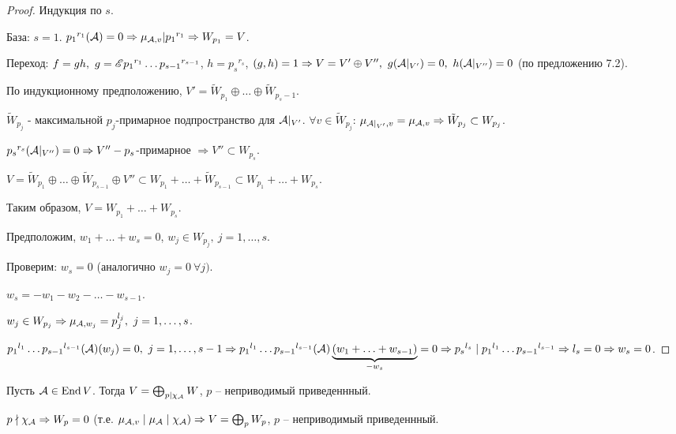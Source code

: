 \documentclass[main]{subfiles}
\begin{document}
\begin{proof}
    Индукция по $s$.

    База: $s = 1$. ${p_1}^{r_1}(\mathcal{A}) = 0 \Rightarrow \mu_{\mathcal{A}, v} | {p_1}^{r_1} \Rightarrow W_{p_1} = V$.

    Переход: $f = gh, \ g = \mathscr{E} {p_1}^{r_1} \ldots {p_{s-1}}^{r_{s-1}}$, $h = {p_s}^{r_s}$, $(g, h) = 1 \Rightarrow
        V = V' \oplus V'', \ g(\mathcal{A} |_{V'}) = 0, \ h(\mathcal{A} |_{V''}) = 0$ (по предложению 7.2).

    По индукционному предположению, $V' =  \tilde{W}_{p_1} \oplus \ldots \oplus \tilde{W}_{p_s-1}$.

    $\tilde{W}_{p_j}$ - максимальной $p_j$-примарное подпространство для $\mathcal{A} |_{V'}$.
    $\forall v \in \tilde{W}_{p_j}$: $\mu_{\mathcal{A} |_{V'}, v} = \mu_{\mathcal{A}, v} \Rightarrow \tilde{W}_{p_j} \subset W_{p_j}$.

    ${p_s}^{r_s}(\mathcal{A} |_{V''}) = 0 \Rightarrow V'' - p_s$-примарное $ \Rightarrow
        V'' \subset W_{p_s}$.

    $V = \tilde{W}_{p_1} \oplus \ldots \oplus \tilde{W}_{p_{s-1}} \oplus V'' \subset W_{p_1} + \ldots + \tilde{W}_{p_{s-1}} \subset W_{p_1} + \ldots + W_{p_s}$.

    Таким образом, $V = W_{p_1} + \ldots + W_{p_s}$.

    Предположим, $w_1 + \ldots + w_s = 0$, $w_j \in W_{p_j}, \ j = 1, \ldots, s$.

    Проверим: $w_s = 0$ (аналогично $w_j = 0 \ \forall j)$.

    $w_s = - w_1 - w_2 - \ldots - w_{s-1}$.

    $w_j \in W_{p_j} \Rightarrow \mu_{\mathcal{A}, w_j} = p_j^{l_j}, \ j = 1, \ldots, s$.

    ${p_1}^{l_1} \ldots {p_{s-1}}^{l_{s-1}} (\mathcal{A}) (w_j) = 0, \ j = 1, \ldots, s-1 \Rightarrow
        {p_1}^{l_1} \ldots {p_{s-1}}^{l_{s-1}} (\mathcal{A}) \underbrace{(w_1 + \ldots + w_{s-1})}_{-w_s} = 0  \Rightarrow
        {p_s}^{l_s} \mid {p_1}^{l_1} \ldots {p_{s-1}}^{l_{s-1}} \Rightarrow l_s = 0 \Rightarrow w_s = 0$.
\end{proof}

\begin{corollary}
    Пусть $\mathcal{A} \in \operatorname{End} V$. Тогда $V = \bigoplus_{p|\chi_{\mathcal{A}}} W$, $p$ -- неприводимый приведеннный.
\end{corollary}

\begin{remark}
    $p \nmid \chi_{\mathcal{A}} \Rightarrow W_p = 0$ (т.е. $\mu_{\mathcal{A}, v} \mid \mu_{\mathcal{A}} \mid \chi_{\mathcal{A}}) \Rightarrow V = \bigoplus_p W_p$, $p$ -- неприводимый приведеннный.
\end{remark}
\end{document}
